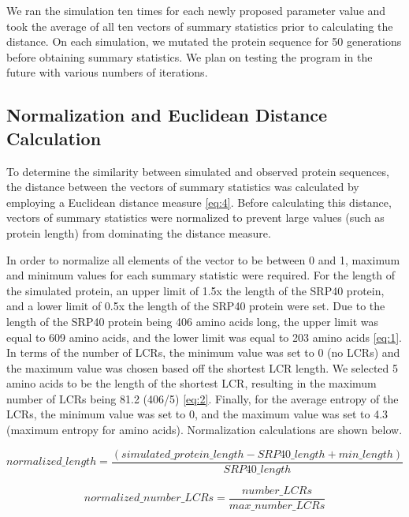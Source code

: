 \documentclass{article}
\begin{document}
We ran the simulation ten times for each newly proposed parameter value and took the average of all ten vectors of summary statistics prior to calculating the distance. On each simulation, we mutated the protein sequence for 50 generations before obtaining summary statistics. We plan on testing the program in the future with various numbers of iterations.

\subsection{Normalization and Euclidean Distance Calculation}

To determine the similarity between simulated and observed protein sequences, the distance between the vectors of summary statistics was calculated by employing a Euclidean distance measure \eqref{eq:4}. Before calculating this distance, vectors of summary statistics were normalized to prevent large values (such as protein length) from dominating the distance measure.

In order to normalize all elements of the vector to be between 0 and 1, maximum and minimum values for each summary statistic were required. For the length of the simulated protein, an upper limit of 1.5x the length of the SRP40 protein, and a lower limit of 0.5x the length of the SRP40 protein were set. Due to the length of the SRP40 protein being 406 amino acids long, the upper limit was equal to 609 amino acids, and the lower limit was equal to 203 amino acids \eqref{eq:1}. In terms of the number of LCRs, the minimum value was set to 0 (no LCRs) and the maximum value was chosen based off the shortest LCR length. We selected 5 amino acids to be the length of the shortest LCR, resulting in the maximum number of LCRs being 81.2 (406/5) \eqref{eq:2}. Finally, for the average entropy of the LCRs, the minimum value was set to 0, and the maximum value was set to 4.3 (maximum entropy for amino acids). Normalization calculations are shown below.


\begin{equation}
	normalized\_length = \frac{(simulated\_protein\_length - SRP40\_length + min\_length)}{SRP40\_length}
	\label{eq:1}
\end{equation}

\begin{equation}
	normalized\_number\_LCRs = \frac{number\_LCRs}{max\_number\_LCRs}
	\label{eq:2}
\end{equation}
\end{document}
